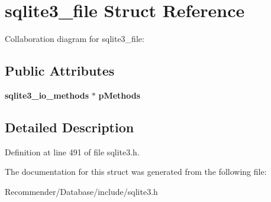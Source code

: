 \section{sqlite3\_\-file Struct Reference}
\label{structsqlite3__file}
Collaboration diagram for sqlite3\_\-file:\subsection*{Public Attributes}
\begin{CompactItemize}
\item 
{\bf sqlite3\_\-io\_\-methods} $\ast$ {\bf pMethods}\label{structsqlite3__file_3d8044de078e021715bc3b7e57dd52a9}

\end{CompactItemize}


\subsection{Detailed Description}




Definition at line 491 of file sqlite3.h.

The documentation for this struct was generated from the following file:\begin{CompactItemize}
\item 
Recommender/Database/include/sqlite3.h\end{CompactItemize}
